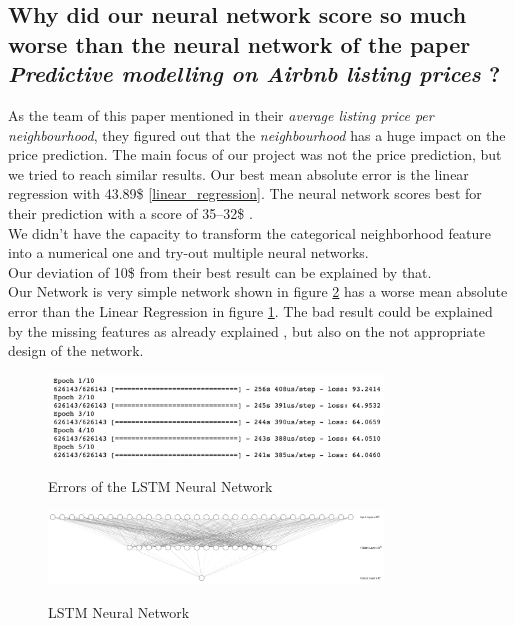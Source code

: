 \documentclass[journal]{IEEEtran}
\begin{document}
\subsection{Why did our neural network score so much worse than the neural network of the paper \textit{Predictive modelling on Airbnb listing prices} \cite{RN1}?}
As the team of this paper \cite{RN1} mentioned in their \textit{average listing price per neighbourhood}, they figured out that the \textit{neighbourhood} has a huge impact on the price prediction. The main focus of our project was not the price prediction, but we tried to reach similar results. Our best mean absolute error is the linear regression with 43.89\$ \ref{linear_regression}. The neural network scores best for their prediction with a score of 35–32\$ \cite{RN1}. \\
We didn't have the capacity to transform the categorical neighborhood feature into a numerical one and try-out multiple neural networks. \\
Our deviation of 10\$ from their best result can be explained by that.\\
Our Network is very simple network shown in figure \ref{lstm} has a worse mean absolute error than the Linear Regression in figure \ref{nn}. 
The bad result could be explained by the missing features as already explained \cite{RN1}, but also on the not appropriate design of the network.

\begin{figure}
  \begin{center}
  \includegraphics[width=3.5in]{photo/lstm.png}\\
  \caption{Errors of the LSTM Neural Network}\label{nn}
  \end{center}
\end{figure}
\begin{figure}
  \begin{center}
  \includegraphics[width=3.5in]{photo/nn.png}\\
  \caption{LSTM Neural Network}\label{lstm}
  \end{center}
\end{figure}
\end{document}
